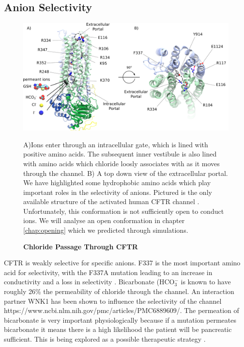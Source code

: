 \subsection {Anion Selectivity}

\begin{figure}
	\begin{center}
	\includegraphics[width=\textwidth]{figures/chloride_passage_figure.pdf}
	\end{center}
	\label{chloride_passage}
	\captionsetup{singlelinecheck = false, justification=raggedright}
	\caption[Chlrodie Passage through CFTR] {\textbf{Chloride Passage Through CFTR}}{A)Ions enter through an intracellular gate, which is lined with positive amino acids. The subsequent inner vestibule is also lined with amino acids which chloride loosly associates with as it moves through the channel. B) A top down view of the extracellular portal. We have highlighted some hydrophobic amino acids which play important roles in the selectivity of anions. Pictured is the only available structure of the activated human CFTR channel \cite{zhang2018}. Unfortunately, this conformation is not sufficiently open to conduct ions. We will analyse an open conformation in chapter \ref{chap:opening} which we predicted through simulations.} 

\end{figure}
CFTR is weakly selective for specific anions. F337 is the most important amino acid for selectivity, with the F337A mutation leading to an increase in conductivity and a loss in selectivity \cite{wei2016}. Bicarbonate (HCO$_3^-$ is known to have roughly 26\% the permeability of chloride through the channel. An interaction partner WNK1 has been shown to influence the selectivity of the channel https://www.ncbi.nlm.nih.gov/pmc/articles/PMC6889609/. The permeation of bicarbonate is very important physiologically because if a mutation permeates bicarbonate it means there is a high likelihood the patient will be pancreatic sufficient. This is being explored as a possible therapeutic strategy \cite{ferrera2021}. 

